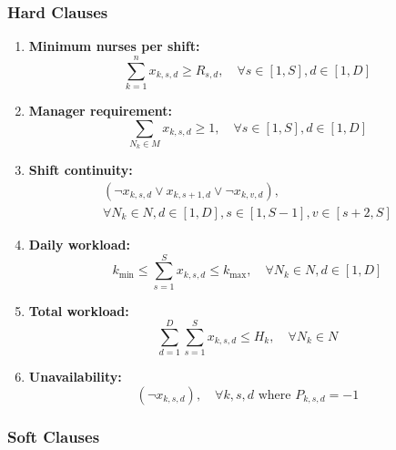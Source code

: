 \documentclass[sigconf, 10pt]{acmart}
\begin{document}
\subsubsection{Hard Clauses}

\begin{enumerate}
    \item \textbf{Minimum nurses per shift:}
    \begin{equation}
        \sum_{k=1}^{n} x_{k,s,d} \geq R_{s,d}, \quad \forall s \in [1,S], d \in [1,D]
    \end{equation}

    \item \textbf{Manager requirement:}
    \begin{equation}
        \sum_{N_k \in M} x_{k,s,d} \geq 1, \quad \forall s \in [1,S], d \in [1,D]
    \end{equation}

    \item \textbf{Shift continuity:}
    \begin{equation}
    \begin{gathered}
        ( \neg x_{k,s,d} \lor x_{k,s+1,d} \lor \neg x_{k,v,d} ), \\
        \forall N_k \in N, d \in [1,D], s \in [1,S-1], v \in [s+2,S]
    \end{gathered}
    \end{equation}

    \item \textbf{Daily workload:}
    \begin{equation}
        k_{\min} \leq \sum_{s=1}^{S} x_{k,s,d} \leq k_{\max}, \quad \forall N_k \in N, d \in [1,D]
    \end{equation}

    \item \textbf{Total workload:}
    \begin{equation}
        \sum_{d=1}^{D} \sum_{s=1}^{S} x_{k,s,d} \leq H_k, \quad \forall N_k \in N
    \end{equation}

    \item \textbf{Unavailability:}
    \begin{equation}
        (\neg x_{k,s,d}), \quad \forall k,s,d \text{ where } P_{k,s,d} = -1
    \end{equation}
\end{enumerate}

\subsubsection{Soft Clauses}
\end{document}
